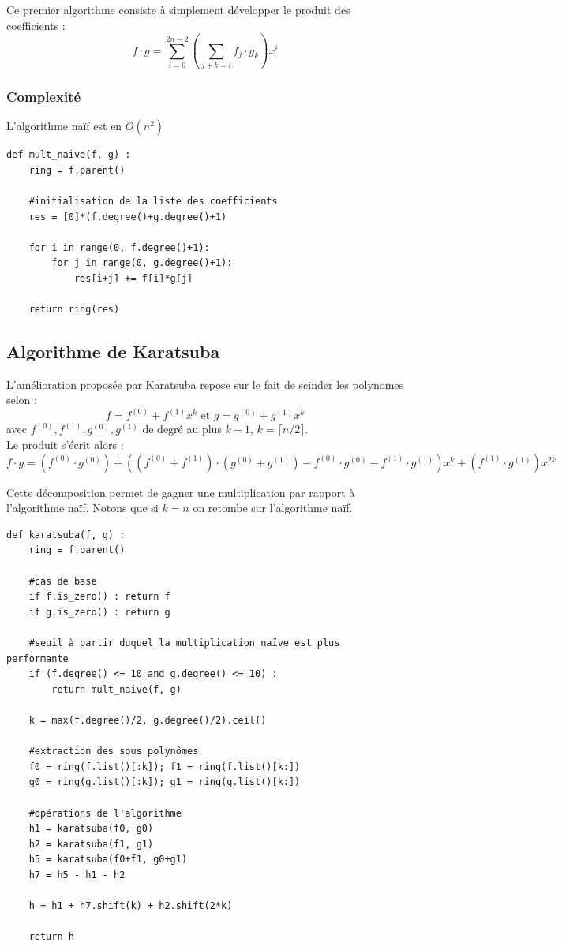 \documentclass[a4paper]{article}
\begin{document}
Ce premier algorithme consiste à simplement développer le produit des coefficients :
\[
f\cdot g=\sum_{i=0}^{2n-2} (\sum_{j+k=i}f_j\cdot g_k) x^i
\]

\subsubsection*{Complexité}
L'algorithme naïf est en $O(n^2)$

\begin{lstlisting}[title={multiplication naive}]
    def mult_naive(f, g) :
    ring = f.parent()

    #initialisation de la liste des coefficients
    res = [0]*(f.degree()+g.degree()+1) 
    
    for i in range(0, f.degree()+1):
        for j in range(0, g.degree()+1):
            res[i+j] += f[i]*g[j]

    return ring(res) 
\end{lstlisting}


\subsection{Algorithme de Karatsuba}

L'amélioration proposée par Karatsuba repose sur le fait de scinder les polynomes selon :
\[
f=f^{(0)}+f^{(1)}x^k\text{ et }g = g^{(0)}+g^{(1)}x^k
\]
avec $f^{(0)}, f^{(1)}, g^{(0)}, g^{(1)}$ de degré au plus $k-1$, $k=\lceil n/2 \rceil$. \\
Le produit s'écrit alors :
\[
  f\cdot g = (f^{(0)}\cdot g^{(0)})
  +\left((f^{(0)}+f^{(1)})\cdot (g^{(0)} + g^{(1)}) - f^{(0)}\cdot g^{(0)} - f^{(1)}\cdot g^{(1)}\right)x^k+
  (f^{(1)}\cdot g^{(1)})x^{2k} 
\]

Cette décomposition permet de gagner une multiplication par rapport à l'algorithme naïf. Notons que si $k=n$ on retombe sur l'algorithme naïf.

\begin{lstlisting}[title={Karatsuba}]
def karatsuba(f, g) :
    ring = f.parent()

    #cas de base
    if f.is_zero() : return f
    if g.is_zero() : return g
    
    #seuil à partir duquel la multiplication naïve est plus performante
    if (f.degree() <= 10 and g.degree() <= 10) : 
        return mult_naive(f, g)

    k = max(f.degree()/2, g.degree()/2).ceil()

    #extraction des sous polynômes
    f0 = ring(f.list()[:k]); f1 = ring(f.list()[k:])
    g0 = ring(g.list()[:k]); g1 = ring(g.list()[k:])

    #opérations de l'algorithme
    h1 = karatsuba(f0, g0)
    h2 = karatsuba(f1, g1)
    h5 = karatsuba(f0+f1, g0+g1)
    h7 = h5 - h1 - h2

    h = h1 + h7.shift(k) + h2.shift(2*k)

    return h
\end{lstlisting}
\end{document}

